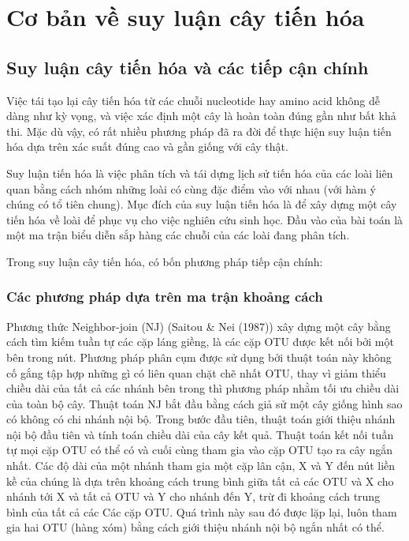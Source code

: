 \documentclass[12pt]{report}
\begin{document}
\newpage	
\chapter{Cơ bản về suy luận cây tiến hóa}
\label{chap:chapter2}
\section{Suy luận cây tiến hóa và các tiếp cận chính }
Việc tái tạo lại cây tiến hóa từ các chuỗi nucleotide hay amino acid không dễ dàng như kỳ vọng, và việc xác định một cây là hoàn toàn đúng gần như bất khả thi. Mặc dù vậy, có rất nhiều phương pháp đã ra đời để thực hiện suy luận tiến hóa dựa trên xác suất đúng cao và gần giống với cây thật.

Suy luận tiến hóa \cite{cia-10} là việc phân tích và tái dựng lịch sử tiến hóa của các loài liên quan bằng cách nhóm những loài có cùng đặc điểm vào với nhau (với hàm ý chúng có tổ tiên chung). Mục đích của suy luận tiến hóa là để xây dựng một cây tiến hóa về loài để phục vụ cho việc nghiên cứu sinh học. Đầu vào của bài toán là một ma trận biểu diễn sắp hàng các chuỗi của các loài đang phân tích.

Trong suy luận cây tiến hóa, có bốn phương pháp tiếp cận chính:

\subsection{Các phương pháp dựa trên ma trận khoảng cách}
Phương thức Neighbor-join \cite{cia-11} (NJ) (Saitou & Nei (1987)) xây dựng một cây bằng cách tìm kiếm tuần tự các cặp láng giềng, là các cặp OTU được kết nối bởi một bên trong nút. Phương pháp phân cụm được sử dụng bởi thuật toán này không cố gắng tập hợp những gì có liên quan chặt chẽ nhất OTU, thay vì giảm thiểu chiều dài của tất cả các nhánh bên trong thì phương pháp nhằm tối ưu chiều dài của toàn bộ cây. Thuật toán NJ bắt đầu bằng cách giả sử một cây giống hình sao có không có chi nhánh nội bộ. Trong bước đầu tiên, thuật toán giới thiệu nhánh nội bộ đầu tiên và tính toán chiều dài của cây kết quả. Thuật toán kết nối tuần tự mọi cặp OTU có thể có và cuối cùng tham gia vào cặp OTU tạo ra cây ngắn nhất. Các độ dài của một nhánh tham gia một cặp lân cận, X và Y đến nút liền kề của chúng là dựa trên khoảng cách trung bình giữa tất cả các OTU và X cho nhánh tới X và tất cả OTU và Y cho nhánh đến Y, trừ đi khoảng cách trung bình của tất cả các Các cặp OTU. Quá trình này sau đó được lặp lại, luôn tham gia hai OTU (hàng xóm) bằng cách giới thiệu nhánh nội bộ ngắn nhất có thể.
\end{document}
